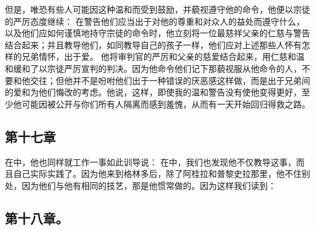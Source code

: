 但是，唯恐有些人可能因这种温和而受到鼓励，并藐视遵守他的命令，他便以宗徒的严厉态度继续： 在警告他们应当出于对他的尊重和对众人的益处而遵守什么，以及他们应如何谨慎地持守宗徒的命令时，他立刻将一位最慈祥父亲的仁慈与警告结合起来；并且教导他们，如同教导自己的孩子一样，他们应对上述那些人怀有怎样的兄弟情怀，出于爱。 他将审判官的严厉和父亲的慈爱结合起来，用仁慈和温和缓和了以宗徒严厉宣判的判决。因为他命令他们记下那藐视服从他命令的人，不要和他交往；但他并不是吩咐他们出于一种错误的厌恶感这样做，而是出于兄弟间的爱和为他们悔改的考虑。他说，这样，即使我的温和警告没有使他变得更好，至少他可能因被公开与你们所有人隔离而感到羞愧，从而有一天开始回归得救之路。\par


\subsection{第十七章}

\par

在中，他也同样就工作一事如此训导说：  在中，我们也发现他不仅教导这事，而且自己实际实践了。因为他来到格林多后，除了阿桂拉和普黎史拉那里，他不住别处，因为他们与他有相同的技艺，那是他惯常做的。因为这样我们读到： \par


\subsection{第十八章。}

\par

